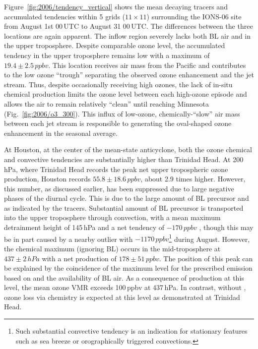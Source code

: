 Figure~\ref{fig:2006/tendency_vertical} shows the mean decaying tracers and accumulated tendencies within 5 grids ($11\times11$) surrounding the
IONS-06 site from August 1st 00\,\unit{UTC} to August 31 00\,\unit{UTC}. The differences between the three locations are again apparent. The inflow
region severely lacks both BL air and {\lnox} in the upper troposphere. Despite comparable ozone level, the accumulated tendency in the upper
troposphere remains low with a maximum of $19.4\pm2.5\,\unit{ppbv}$. This location receives air mass from the Pacific and contributes to the low ozone
``trough'' separating the observed ozone enhancement and the jet stream. Thus, despite occasionally receiving high ozones, the lack of in-situ chemical
production limits the ozone level between each high-ozone episode and allows the air to remain relatively ``clean'' until reaching Minnesota
(Fig.~\ref{fig:2006/o3_300}). This influx of low-ozone, chemically-``slow'' air mass between each jet stream is responsible to generating the oval-shaped
ozone enhancement in the seasonal average.

At Houston, at the center of the mean-state anticyclone, both the ozone chemical and convective tendencies are substantially higher than Trinidad Head.
At 200\,\unit{hPa}, where Trinidad Head records the peak net upper tropospheric ozone production, Houston records $55.8\pm18.6\,\unit{ppbv}$, about
2.9 times higher. However, this number, as discussed earlier, has been suppressed due to large negative phases of the diurnal cycle. This is due to the
large amount of BL precursor and {\lnox} as indicated by the tracers. Substantial amount of BL precursor is transported into the upper troposphere through
convection, with a mean maximum detrainment height of 145\,\unit{hPa} and a net tendency of $-170\,\unit{ppbv}$ , though this may be in part
caused by  a nearby outlier with $-1170\,\unit{ppbv}$\footnote{Such substantial convective tendency is an indication for stationary features such as sea
breeze or orographically triggered convections.} during August. However, the chemical maximum (ignoring BL) occurs in the mid-troposphere at
$437\pm2\,\unit{hPa}$ with a net production of $178\pm51\,\unit{ppbv}$. The position of this peak can be explained by the coincidence of the maximum
level for the prescribed {\lnox} emission based on \citet{Ott:2010lo} and the availability of BL air. As a consequence of production at this level, the mean
ozone VMR exceeds 100\,\unit{ppbv} at 437\,\unit{hPa}. In contrast, without {\lnox}, ozone loss via chemistry is expected at this level as
demonstrated at Trinidad Head.

